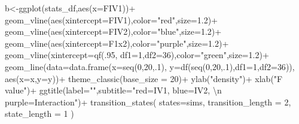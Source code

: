 \documentclass[
  letterpaper,
  DIV=11,
  numbers=noendperiod]{scrreprt}
\newenvironment{Shaded}{\begin{snugshade}}{\end{snugshade}}
\newcommand{\AttributeTok}[1]{\textcolor[rgb]{0.40,0.45,0.13}{#1}}
\newcommand{\DecValTok}[1]{\textcolor[rgb]{0.68,0.00,0.00}{#1}}
\newcommand{\FloatTok}[1]{\textcolor[rgb]{0.68,0.00,0.00}{#1}}
\newcommand{\FunctionTok}[1]{\textcolor[rgb]{0.28,0.35,0.67}{#1}}
\newcommand{\NormalTok}[1]{\textcolor[rgb]{0.00,0.23,0.31}{#1}}
\newcommand{\OtherTok}[1]{\textcolor[rgb]{0.00,0.23,0.31}{#1}}
\newcommand{\SpecialCharTok}[1]{\textcolor[rgb]{0.37,0.37,0.37}{#1}}
\newcommand{\StringTok}[1]{\textcolor[rgb]{0.13,0.47,0.30}{#1}}
\begin{document}
\begin{Shaded}
\begin{Highlighting}[]
\NormalTok{b}\OtherTok{\textless{}{-}}\FunctionTok{ggplot}\NormalTok{(stats\_df,}\FunctionTok{aes}\NormalTok{(}\AttributeTok{x=}\NormalTok{FIV1))}\SpecialCharTok{+}
  \FunctionTok{geom\_vline}\NormalTok{(}\FunctionTok{aes}\NormalTok{(}\AttributeTok{xintercept=}\NormalTok{FIV1),}\AttributeTok{color=}\StringTok{"red"}\NormalTok{,}\AttributeTok{size=}\FloatTok{1.2}\NormalTok{)}\SpecialCharTok{+}
  \FunctionTok{geom\_vline}\NormalTok{(}\FunctionTok{aes}\NormalTok{(}\AttributeTok{xintercept=}\NormalTok{FIV2),}\AttributeTok{color=}\StringTok{"blue"}\NormalTok{,}\AttributeTok{size=}\FloatTok{1.2}\NormalTok{)}\SpecialCharTok{+}
  \FunctionTok{geom\_vline}\NormalTok{(}\FunctionTok{aes}\NormalTok{(}\AttributeTok{xintercept=}\NormalTok{F1x2),}\AttributeTok{color=}\StringTok{"purple"}\NormalTok{,}\AttributeTok{size=}\FloatTok{1.2}\NormalTok{)}\SpecialCharTok{+}
  \FunctionTok{geom\_vline}\NormalTok{(}\AttributeTok{xintercept=}\FunctionTok{qf}\NormalTok{(.}\DecValTok{95}\NormalTok{, }\AttributeTok{df1=}\DecValTok{1}\NormalTok{,}\AttributeTok{df2=}\DecValTok{36}\NormalTok{),}\AttributeTok{color=}\StringTok{"green"}\NormalTok{,}\AttributeTok{size=}\FloatTok{1.2}\NormalTok{)}\SpecialCharTok{+}
  \FunctionTok{geom\_line}\NormalTok{(}\AttributeTok{data=}\FunctionTok{data.frame}\NormalTok{(}\AttributeTok{x=}\FunctionTok{seq}\NormalTok{(}\DecValTok{0}\NormalTok{,}\DecValTok{20}\NormalTok{,.}\DecValTok{1}\NormalTok{),}
                            \AttributeTok{y=}\FunctionTok{df}\NormalTok{(}\FunctionTok{seq}\NormalTok{(}\DecValTok{0}\NormalTok{,}\DecValTok{20}\NormalTok{,.}\DecValTok{1}\NormalTok{),}\AttributeTok{df1=}\DecValTok{1}\NormalTok{,}\AttributeTok{df2=}\DecValTok{36}\NormalTok{)),}
            \FunctionTok{aes}\NormalTok{(}\AttributeTok{x=}\NormalTok{x,}\AttributeTok{y=}\NormalTok{y))}\SpecialCharTok{+}
  \FunctionTok{theme\_classic}\NormalTok{(}\AttributeTok{base\_size =} \DecValTok{20}\NormalTok{)}\SpecialCharTok{+}
  \FunctionTok{ylab}\NormalTok{(}\StringTok{"density"}\NormalTok{)}\SpecialCharTok{+}
  \FunctionTok{xlab}\NormalTok{(}\StringTok{"F value"}\NormalTok{)}\SpecialCharTok{+}
  \FunctionTok{ggtitle}\NormalTok{(}\AttributeTok{label=}\StringTok{""}\NormalTok{,}\AttributeTok{subtitle=}\StringTok{"red=IV1, blue=IV2, }\SpecialCharTok{\textbackslash{}n}\StringTok{ purple=Interaction"}\NormalTok{)}\SpecialCharTok{+}
  \FunctionTok{transition\_states}\NormalTok{(}
    \AttributeTok{states=}\NormalTok{sims,}
    \AttributeTok{transition\_length =} \DecValTok{2}\NormalTok{,}
    \AttributeTok{state\_length =} \DecValTok{1}
\NormalTok{  )}


\end{Highlighting}
\end{Shaded}
\end{document}
